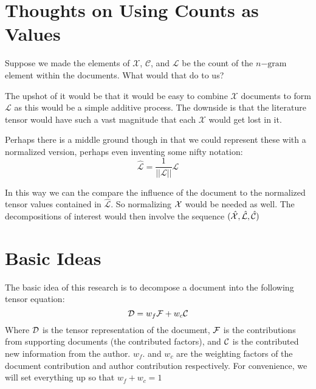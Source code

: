 \documentclass{article}
\begin{document}
\section{Thoughts on Using Counts as Values}
Suppose we made the elements of $\mathcal{X}$, $\mathcal{C}$, and $\mathcal{L}$ be the
count of the $n\mathrm{-gram}$ element within the documents.  What would that do to us?

The upshot of it would be that it would be easy to combine $\mathcal{X}$ documents to 
form $\mathcal{L}$ as this would be a simple additive process. The downside is that the
literature tensor would have such a vast magnitude that each $\mathcal{X}$ would get 
lost in it.

Perhaps there is a middle ground though in that we could represent these with a normalized
version, perhaps even inventing some nifty notation:
\[
\hat{\mathcal{L}} = \displaystyle\frac{1}{||\mathcal{L}||} \mathcal{L}
\]

In this way we can the compare the influence of the document to the normalized tensor
values contained in $\hat{\mathcal{L}}$.  So normalizing $\mathcal{X}$ would be needed as well.
The decompositions of interest would then involve the sequence $(\hat{\mathcal{X}}, \hat{\mathcal{L}}, \hat{\mathcal{C}})$

\section{Basic Ideas}
The basic idea of this research is to decompose a document into the following tensor equation:
\[
\mathcal{D} = w_f \mathcal{F} + w_c \mathcal{C}
\]
Where $\mathcal{D}$ is the tensor representation of the document, $\mathcal{F}$ is the contributions from 
supporting documents (the contributed factors), and $\mathcal{C}$ is the contributed new information from the 
author.  $w_f$. and $w_c$ are the weighting factors of the document contribution and author contribution 
respectively.  For convenience, we will set everything up so that $w_f+w_c = 1$
\end{document}
